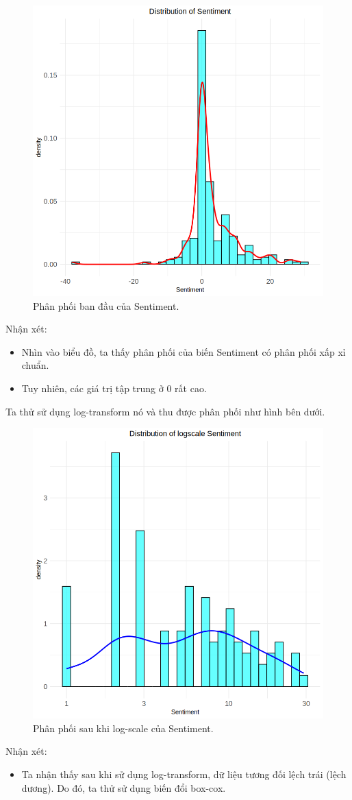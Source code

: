 \begin{figure}[H]
    \centering
    \includegraphics[width=0.75\columnwidth]{csm_figures/sentiment_original_distribution.png}
    \caption{Phân phối ban đầu của Sentiment.}
    \label{fig:sentiment_original_distribution}
\end{figure}

Nhận xét:
\begin{itemize}
    \item Nhìn vào biểu đồ, ta thấy phân phối của biến Sentiment có phân phối xấp xỉ chuẩn.
    \item Tuy nhiên, các giá trị tập trung ở 0 rất cao.
\end{itemize}

Ta thử sử dụng log-transform nó và thu được phân phối như hình bên dưới.

\begin{figure}[H]
    \centering
    \includegraphics[width=0.75\columnwidth]{csm_figures/sentiment_logscale_distribution.png}
    \caption{Phân phối sau khi log-scale của Sentiment.}
    \label{fig:sentiment_logscale_distribution}
\end{figure}
Nhận xét:
\begin{itemize}
    \item Ta nhận thấy sau khi sử dụng log-transform, dữ liệu tương đối lệch trái (lệch dương). Do đó, ta thử sử dụng biến đổi box-cox.
\end{itemize}

